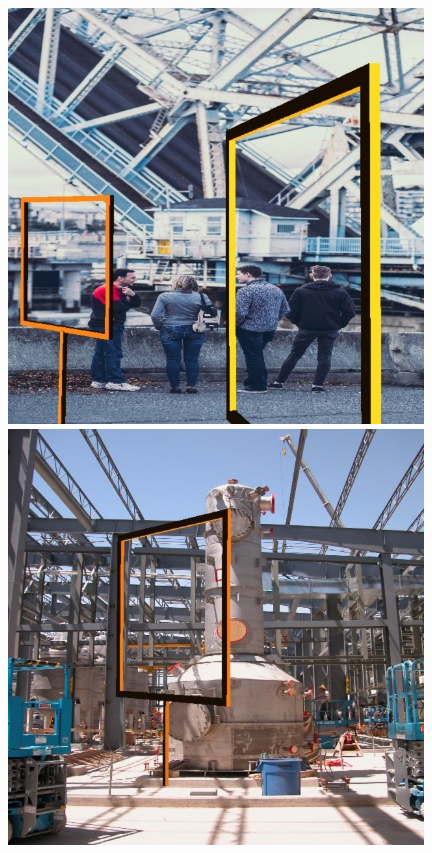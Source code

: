\documentclass{article}
\begin{document}
\begin{figure}[h]
\begin{minipage}{0.24\textwidth}
	
	\end{minipage}
	\begin{minipage}{0.24\textwidth}
		\centering
		\includegraphics[width=\textwidth]{fig/sample2}
	\end{minipage}
	\begin{minipage}{0.24\textwidth}
		\centering
		\includegraphics[width=\textwidth]{fig/sample3}

\end{minipage}
\end{figure}
\end{document}
